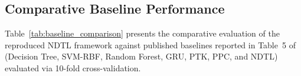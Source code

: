 \documentclass[10pt,twocolumn]{article}
\begin{document}
\begin{table}[h]
\centering
{}
\caption{Empirical Twitter dataset statistics replicating Table~4 of~\cite{fionda2025logic}.}
\label{tab:dataset_stats}
\end{table}

\subsection{Comparative Baseline Performance}
Table~\ref{tab:baseline_comparison} presents the comparative evaluation of the reproduced NDTL framework against published baselines reported in Table~5 of~\cite{fionda2025logic} (Decision Tree, SVM-RBF, Random Forest, GRU, PTK, PPC, and NDTL) evaluated via 10-fold cross-validation.
\end{document}
